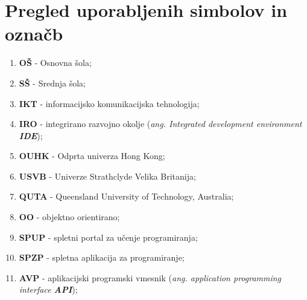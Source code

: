 
\section*{Pregled uporabljenih simbolov in označb}
\label{sec:pregled_uporabljenih_simbolov_in_označb}

\begin{enumerate}[leftmargin=*]
\item \textbf{OŠ} - Osnovna šola;
\item \textbf{SŠ} - Srednja šola;
\item \textbf{IKT} - informacijsko komunikacijska tehnologija;
\item \textbf{IRO} - integrirano razvojno okolje (\emph{ang. Integrated
    development environment \textbf{IDE}});
\item \textbf{OUHK} - Odprta univerza Hong Kong;
  
\item \textbf{USVB} - Univerze Strathclyde Velika Britanija;
\item \textbf{QUTA} - Queensland University of Technology, Australia;
\item \textbf{OO} - objektno orientirano;
  
\item \textbf{SPUP} - spletni portal za učenje programiranja;
\item \textbf{SPZP} - spletna aplikacija za programiranje;
\item \textbf{AVP} - aplikacijski programski vmesnik
  (\emph{ang. application programming interface \textbf{API}});

  
\end{enumerate}




